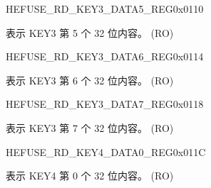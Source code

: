 \begin{register}{H}{EFUSE\_RD\_KEY3\_DATA5\_REG}{0x0110}\label{regdesc:EFUSERDKEY3DATA5REG}
%
\regnewline%
\begin{regdesc}\begin{reglist}
\label{fielddesc:EFUSEKEY3DATA5}\item [EFUSE\_KEY3\_DATA5] 表示 KEY3 第 5 个 32 位内容。 (RO)
\end{reglist}\end{regdesc}
\end{register}


\begin{register}{H}{EFUSE\_RD\_KEY3\_DATA6\_REG}{0x0114}\label{regdesc:EFUSERDKEY3DATA6REG}
%
\regnewline%
\begin{regdesc}\begin{reglist}
\label{fielddesc:EFUSEKEY3DATA6}\item [EFUSE\_KEY3\_DATA6] 表示 KEY3 第 6 个 32 位内容。 (RO)
\end{reglist}\end{regdesc}
\end{register}


\begin{register}{H}{EFUSE\_RD\_KEY3\_DATA7\_REG}{0x0118}\label{regdesc:EFUSERDKEY3DATA7REG}
%
\regnewline%
\begin{regdesc}\begin{reglist}
\label{fielddesc:EFUSEKEY3DATA7}\item [EFUSE\_KEY3\_DATA7] 表示 KEY3 第 7 个 32 位内容。 (RO)
\end{reglist}\end{regdesc}
\end{register}


\begin{register}{H}{EFUSE\_RD\_KEY4\_DATA0\_REG}{0x011C}\label{regdesc:EFUSERDKEY4DATA0REG}
%
\regnewline%
\begin{regdesc}\begin{reglist}
\label{fielddesc:EFUSEKEY4DATA0}\item [EFUSE\_KEY4\_DATA0] 表示 KEY4 第 0 个 32 位内容。 (RO)
\end{reglist}\end{regdesc}
\end{register}


